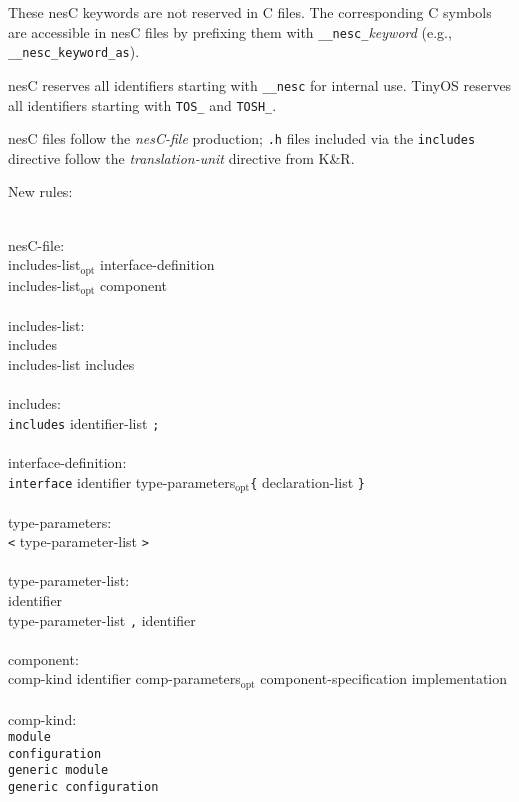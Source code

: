 \documentclass[11pt,letterpaper]{article}
\newcommand{\kw}[1]{{\tt #1}}
\newcommand{\file}[1]{{\tt #1}}
\newcommand{\nesc}{nesC\xspace}
\newcommand{\tinyos}{TinyOS\xspace}
\newcommand{\opt}{$_{\mbox{opt}}$\xspace}
\newcommand{\grammarindent}{\hspace*{2cm}\= \\ \kill}
\begin{document}
These \nesc keywords are not reserved in C files. The corresponding C
symbols are accessible in \nesc files by prefixing them with
\kw{\_\_nesc\_}\emph{keyword} (e.g., \kw{\_\_nesc\_keyword\_as}).

\nesc reserves all identifiers starting with \kw{\_\_nesc} for internal
use. \tinyos reserves all identifiers starting with \kw{TOS\_} and
\kw{TOSH\_}.

\nesc files follow the \emph{nesC-file} production; \file{.h} files included
via the \kw{includes} directive follow the \emph{translation-unit}
directive from K\&R. 

New rules: \em \begin{tabbing}
\grammarindent
nesC-file: \\
\>	includes-list\opt interface-definition\\
\>	includes-list\opt component\\
\\
includes-list:\\
\>	includes\\
\>	includes-list includes\\
\\
includes:\\
\>	\kw{includes} identifier-list \kw{;}\\
\\
interface-definition:\\
\>	\kw{interface} identifier type-parameters\opt\kw{\{} declaration-list \kw{\}}\\
\\
type-parameters:\\
\>	\kw{<} type-parameter-list \kw{>}\\
\\
type-parameter-list:\\
\>	identifier\\
\>	type-parameter-list \kw{,} identifier\\
\\
component:\\
\>	comp-kind identifier comp-parameters\opt component-specification implementation\\
\\
comp-kind:\\
\>	\kw{module}\\
\>	\kw{configuration}\\
\>	\kw{generic module}\\
\>	\kw{generic configuration}\\
\\

\end{tabbing}
\end{document}
